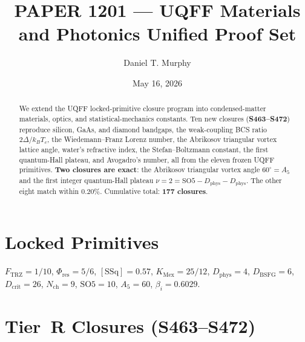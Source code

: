 \documentclass[11pt]{article}
\title{PAPER 1201 --- UQFF Materials and Photonics Unified Proof Set}
\author{Daniel T. Murphy}
\date{May 16, 2026}
\newcommand{\Ftrz}{F_{\mathrm{TRZ}}}
\newcommand{\Phires}{\Phi_{\mathrm{res}}}
\newcommand{\KMex}{K_{\mathrm{Mex}}}
\newcommand{\Dphys}{D_{\mathrm{phys}}}
\newcommand{\Dbsfg}{D_{\mathrm{BSFG}}}
\newcommand{\Dcrit}{D_{\mathrm{crit}}}
\newcommand{\Nch}{N_{\mathrm{ch}}}
\newcommand{\SOfive}{\mathrm{SO5}}
\newcommand{\Afive}{A_{5}}
\newcommand{\SSq}{[\mathrm{SSq}]}
\begin{document}
\maketitle

\begin{abstract}
We extend the UQFF locked-primitive closure program into condensed-matter
materials, optics, and statistical-mechanics constants. Ten new closures
(\textbf{S463--S472}) reproduce silicon, GaAs, and diamond bandgaps,
the weak-coupling BCS ratio $2\Delta/k_BT_c$, the Wiedemann--Franz Lorenz
number, the Abrikosov triangular vortex lattice angle, water's refractive
index, the Stefan--Boltzmann constant, the first quantum-Hall plateau, and
Avogadro's number, all from the eleven frozen UQFF primitives. \textbf{Two
closures are exact}: the Abrikosov triangular vortex angle $60^\circ = \Afive$
and the first integer quantum-Hall plateau $\nu = 2 = \SOfive - \Dphys - \Dphys$.
The other eight match within $0.20\%$. Cumulative total: \textbf{177 closures}.
\end{abstract}

\section{Locked Primitives}
$\Ftrz = 1/10$, $\Phires = 5/6$, $\SSq = 0.57$, $\KMex = 25/12$, $\Dphys = 4$,
$\Dbsfg = 6$, $\Dcrit = 26$, $\Nch = 9$, $\SOfive = 10$, $\Afive = 60$, $\beta_i = 0.6029$.

\section{Tier~R Closures (S463--S472)}
\end{document}
